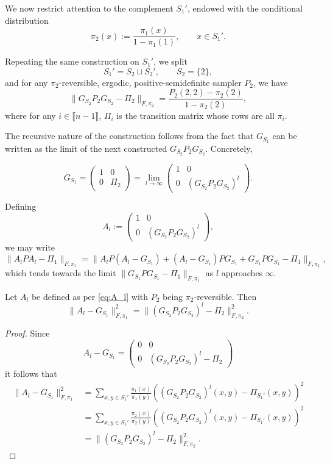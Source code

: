 \documentclass[EJP]{ejpecp} %
\begin{document}
We now restrict attention to the complement $S_1'$, endowed with the conditional distribution
$$\pi_2(x) := \frac{\pi_1(x)}{1-\pi_1(1)}, \qquad x\in S_1'.$$

Repeating the same construction on $S_1'$, we split
$$S_1' = S_2 \sqcup S_2', \qquad S_2=\{2\},$$
and for any $\pi_2$-reversible, ergodic, positive-semidefinite sampler $P_2$, we have
$$\|G_{S_2}P_2G_{S_2}-\Pi_2\|_{F,\pi_2} = \frac{P_2(2,2)-\pi_2(2)}{1-\pi_2(2)},$$
where for any $i \in \llbracket n-1 \rrbracket$, $\Pi_i$ is the transition matrix whose rows are all $\pi_i.$

The recursive nature of the construction follows from the fact that $G_{S_1}$ can be written as the limit of the next constructed $G_{S_2}P_2G_{S_2}$. Concretely,

$$G_{S_1} =
\begin{pmatrix}
1 & 0\\
0 & \Pi_2
\end{pmatrix}
=
\lim_{l\to\infty}
\begin{pmatrix}
1 & 0\\
0 & (G_{S_2}P_2G_{S_2})^l
\end{pmatrix}.
$$

Defining
\begin{equation}\label{eq:A_l}
    A_l := \begin{pmatrix}
    1 & 0\\
    0 & (G_{S_2}P_2G_{S_2})^l
    \end{pmatrix}, 
\end{equation}
we may write
$$\|A_l P A_l - \Pi_1\|_{F,\pi_1} = \|A_l P (A_l-G_{S_1}) + (A_l-G_{S_1})PG_{S_1} + G_{S_1}PG_{S_1}-\Pi_1\|_{F,\pi_1},
$$
which tends towards the limit $\|G_{S_1}PG_{S_1}-\Pi_1\|_{F,\pi_1}$ as $l$ approaches $\infty$.

\begin{lemma} \label{lemma:A_l-G_S}
    Let $A_l$ be defined as per \eqref{eq:A_l} with $P_2$ being $\pi_2$-reversible. Then 
    $$\| A_l - G_{S_1}\|_{F,\pi_1}^2 = \|(G_{S_2}P_2G_{S_2})^l - \Pi_2\|_{F, \pi_2}^2.$$
\end{lemma}

\begin{proof}
    Since 
    $$A_l - G_{S_1} = \begin{pmatrix}
    0 & 0\\
    0 & (G_{S_2}P_2G_{S_2})^l - \Pi_2
    \end{pmatrix}$$
    it follows that 
    \begin{align}
        \| A_l - G_{S_1}\|_{F,\pi_1}^2 &= \sum_{x,y \in S_1'} \frac{\pi_1(x)}{\pi_1(y)}\left((G_{S_2}P_2G_{S_2})^l(x,y) - \Pi_{S_1'}(x,y)\right)^2\\
        &= \sum_{x,y \in S_1'} \frac{\pi_2(x)}{\pi_2(y)}\left((G_{S_2}P_2G_{S_2})^l(x,y) - \Pi_{S_1'}(x,y)\right)^2 \\
        &= \|(G_{S_2}P_2G_{S_2})^l - \Pi_{2}\|_{F, \pi_2}^2.
    \end{align}
\end{proof}
\end{document}
